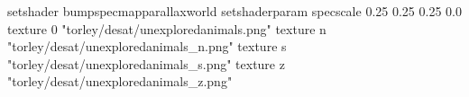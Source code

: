 setshader bumpspecmapparallaxworld
setshaderparam specscale 0.25 0.25 0.25 0.0
texture 0 "torley/desat/unexploredanimals.png"
texture n "torley/desat/unexploredanimals_n.png"
texture s "torley/desat/unexploredanimals_s.png"
texture z "torley/desat/unexploredanimals_z.png"

